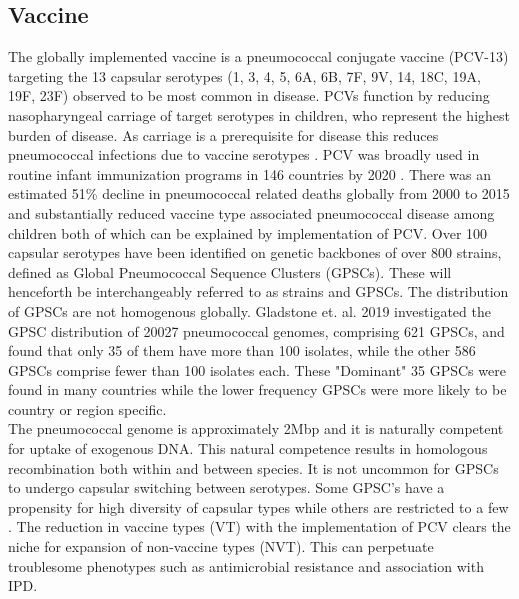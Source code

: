 \documentclass{article}
\begin{document}
\subsection{Vaccine} 
The globally implemented vaccine is a pneumococcal conjugate vaccine (PCV-13) targeting the 13 capsular serotypes (1, 3, 4, 5, 6A, 6B, 7F, 9V, 14, 18C, 19A, 19F, 23F) observed to be most common in disease\cite{VaccineInformationStatement2019}. PCVs function by reducing nasopharyngeal carriage of target serotypes in children, who represent the highest burden of disease. As carriage is a prerequisite for disease this reduces pneumococcal infections due to vaccine serotypes \cite{bogaertStreptococcusPneumoniaeColonisation2004,wyllieMolecularSurveillanceStreptococcus2016}. PCV was broadly used in routine infant immunization programs in 146 countries by 2020 \cite{VaccineInformationStatement2019}. There was an estimated 51\% decline in pneumococcal related deaths globally from 2000 to 2015 and substantially reduced vaccine type associated pneumococcal disease among children both of which can be explained by implementation of PCV\cite{wahlBurdenStreptococcusPneumoniae2018, pilishviliSustainedReductionsInvasive2010,vongottbergEffectsVaccinationInvasive2014}. Over 100 capsular serotypes have been identified on genetic backbones of over 800 strains, defined as Global Pneumococcal Sequence Clusters (GPSCs)\cite{gladstoneInternationalGenomicDefinition2019b}. These will henceforth be interchangeably referred to as strains and GPSCs. The distribution of  GPSCs are not homogenous globally. Gladstone et. al. 2019 investigated the GPSC distribution of 20027 pneumococcal genomes, comprising 621 GPSCs, and found that only 35 of them have more than 100 isolates, while the other 586 GPSCs comprise fewer than 100 isolates each. These "Dominant" 35 GPSCs were found in many countries while the lower frequency GPSCs were more likely to be country or region specific\cite{gladstoneInternationalGenomicDefinition2019b}. 
\\The pneumococcal genome is approximately 2Mbp and it is naturally competent for uptake of exogenous DNA. This natural competence results in homologous recombination both within and between species. It is not uncommon for GPSCs to undergo capsular switching between serotypes. Some GPSC’s have a propensity for high diversity of capsular types while others are restricted to a few \cite{loPneumococcalLineagesAssociated2019}. The reduction in vaccine types (VT) with the implementation of PCV clears the niche for expansion of non-vaccine types (NVT). This can perpetuate troublesome phenotypes such as antimicrobial resistance and association with IPD.
\end{document}
